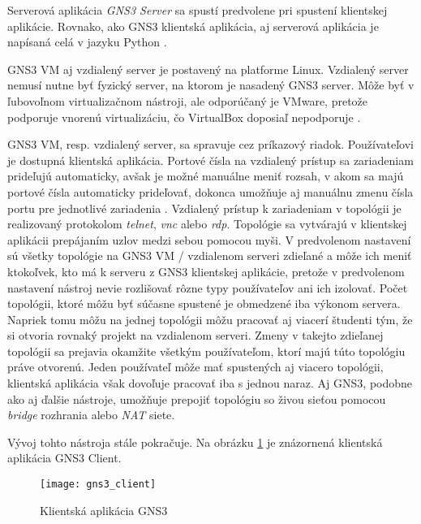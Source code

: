 Serverová aplikácia \emph{GNS3 Server} sa spustí predvolene pri spustení klientskej aplikácie. Rovnako, ako GNS3 klientská aplikácia, aj serverová aplikácia je napísaná celá v jazyku Python \cite{gns3_server_github}.

GNS3 VM aj vzdialený server je postavený na platforme Linux. Vzdialený server nemusí nutne byť fyzický server, na ktorom je nasadený GNS3 server. Môže byť v ľubovoľnom virtualizačnom nástroji, ale odporúčaný je VMware, pretože podporuje vnorenú virtualizáciu, čo VirtualBox doposiaľ nepodporuje \cite{nested_virtualization}.

GNS3 VM, resp. vzdialený server, sa spravuje cez príkazový riadok. Používateľovi je dostupná klientská aplikácia. Portové čísla na vzdialený prístup sa zariadeniam prideľujú automaticky, avšak je možné manuálne meniť rozsah, v akom sa majú portové čísla automaticky prideľovať, dokonca umožňuje aj manuálnu zmenu čísla portu pre jednotlivé zariadenia \cite{gns3_console_ports, gns3_console_ports_remote}. Vzdialený prístup k zariadeniam v topológii je realizovaný protokolom \emph{telnet}, \emph{vnc} alebo \emph{rdp}. Topológie sa vytvárajú v klientskej aplikácii prepájaním uzlov medzi sebou pomocou myši. V predvolenom nastavení sú všetky topológie na GNS3 VM / vzdialenom serveri zdieľané a môže ich meniť ktokoľvek, kto má k serveru z GNS3 klientskej aplikácie, pretože v predvolenom nastavení nástroj nevie rozlišovať rôzne typy používateľov ani ich izolovať. Počet topológii, ktoré môžu byť súčasne spustené je obmedzené iba výkonom servera. Napriek tomu môžu na jednej topológii môžu pracovať aj viacerí študenti tým, že si otvoria rovnaký projekt na vzdialenom serveri. Zmeny v takejto zdieľanej topológii sa prejavia okamžite všetkým používateľom, ktorí majú túto topológiu práve otvorenú. Jeden používateľ môže mať spustených aj viacero topológii, klientská aplikácia však dovoľuje pracovať iba s jednou naraz. Aj GNS3, podobne ako aj ďalšie nástroje, umožňuje prepojiť topológiu so živou sieťou pomocou \emph{bridge} rozhrania alebo \emph{NAT} siete.

Vývoj tohto nástroja stále pokračuje. Na obrázku \ref{obr:gns3_client} je znázornená klientská aplikácia GNS3 Client.

\begin{figure}
    \centering
    \texttt{[image: gns3\_client]}
    \caption{Klientská aplikácia GNS3}
    \label{obr:gns3_client}
\end{figure}





